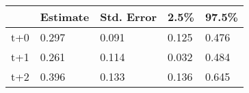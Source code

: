 \begin{tabular}{lllll}
  \toprule
  & Estimate & Std. Error & 2.5\% & 97.5\% \\ 
  \midrule
t+0 & 0.297 & 0.091 & 0.125 & 0.476 \\ 
  t+1 & 0.261 & 0.114 & 0.032 & 0.484 \\ 
  t+2 & 0.396 & 0.133 & 0.136 & 0.645 \\ 
   \bottomrule
\end{tabular}

